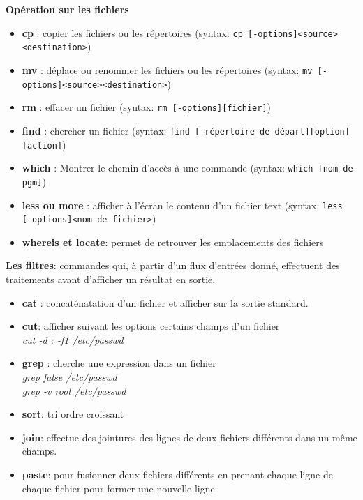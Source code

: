 \documentclass[french]{beamer}
\begin{document}
\begin{frame}
\textbf{Opération sur les fichiers}
    \begin{itemize}
    \item \textbf{cp} : copier les fichiers ou les répertoires (syntax: \texttt{cp [-options]<source><destination>})
    \item \textbf{mv} : déplace ou renommer les fichiers ou les répertoires (syntax: \texttt{mv [-options]<source><destination>})
    \item \textbf{rm} : effacer un fichier (syntax: \texttt{rm [-options][fichier]})
    \item \textbf{find} : chercher un fichier (syntax: \texttt{find [-répertoire de départ][option][action]})
    \item \textbf{which} : Montrer le chemin d'accès à une commande (syntax: \texttt{which [nom de pgm]})
    \item \textbf{less ou more} : afficher à l'écran le contenu d'un fichier text (syntax: \texttt{less [-options]<nom de fichier>})
    \item \textbf{whereis et locate}: permet de retrouver les emplacements des
    fichiers
    \end{itemize}
\end{frame}

\begin{frame}
\textbf{Les filtres}: commandes qui, à partir d'un flux d'entrées donné,
effectuent des traitements avant d'afficher un résultat en sortie.
    \begin{itemize}
    \item \textbf{cat} : concaténatation d'un fichier et afficher sur la sortie
    standard. \\
    \item \textbf{cut}: afficher suivant les options certains champs d'un
    fichier \\
    \textit{cut -d : -f1 /etc/passwd}
    \item \textbf{grep} : cherche une expression dans un fichier \\
    \textit{grep false /etc/passwd} \\
    \textit{grep -v root /etc/passwd} \\
    \item \textbf{sort}: tri ordre croissant
    \item \textbf{join}: effectue des jointures des lignes de deux fichiers
    différents dans un même champs. 
    \item \textbf{paste}: pour fusionner deux fichiers différents en prenant
    chaque ligne de chaque fichier pour former une nouvelle ligne
    \end{itemize}
\end{frame}
\end{document}
